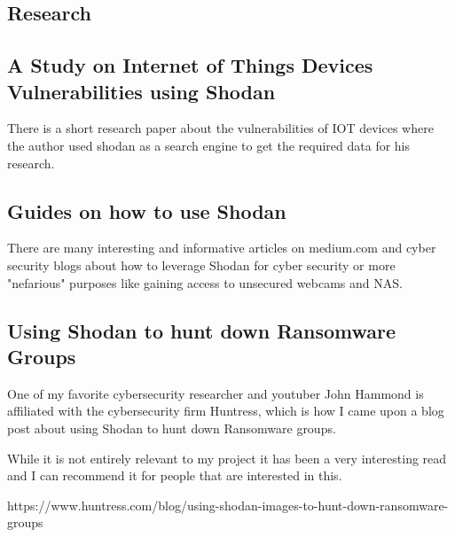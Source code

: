 \documentclass[11pt,a4paper]{article}
\begin{document}
\begin{research}
\section{Research}


\subsection{A Study on Internet of Things Devices Vulnerabilities using Shodan}
There is a short research paper about the vulnerabilities of IOT devices where the author used shodan as a search engine
to get the required data for his research.

\subsection{Guides on how to use Shodan}
There are many interesting and informative articles on medium.com and cyber security blogs about how to leverage Shodan
for cyber security or more "nefarious" purposes like gaining access to unsecured webcams and NAS.

\subsection{Using Shodan to hunt down Ransomware Groups}
One of my favorite cybersecurity researcher and youtuber John Hammond is affiliated with the cybersecurity firm Huntress,
which is how I came upon a blog post about using Shodan to hunt down Ransomware groups.

While it is not entirely relevant to my project it has been a very interesting read and I can recommend it for people that
are interested in this.

https://www.huntress.com/blog/using-shodan-images-to-hunt-down-ransomware-groups


\end{research}
\newpage
\end{document}
